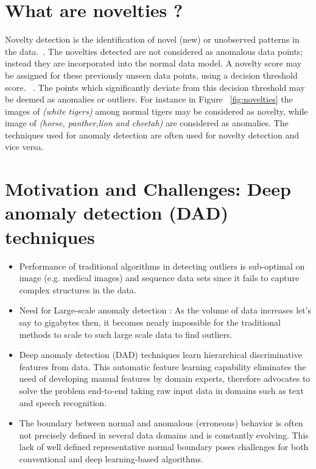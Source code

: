 \section{What are novelties ?}
Novelty detection is the identification of novel (new) or unobserved patterns in the data.~\cite{miljkovic2010review}. The novelties detected are not considered as anomalous data points; instead they are incorporated into the normal data model. A novelty score may be assigned for these previously unseen data points, using a decision threshold score. ~\cite{pimentel2014review}.  The points which significantly deviate from this decision threshold may be deemed as anomalies or outliers. For instance in Figure ~\ref{fig:novelties}  the images of \textit{(white tigers)} among normal tigers may be considered as novelty, while image of \textit{(horse, panther,lion and cheetah)} are considered as anomalies.
The techniques used for anomaly detection are often used for novelty detection and vice versa.



\section{Motivation and Challenges: Deep anomaly detection (DAD) techniques}
\begin{itemize}
\item Performance of traditional algorithms in detecting outliers is sub-optimal on  image (e.g. medical images) and sequence data sets since it fails to capture complex structures in the data.
\item  Need for Large-scale anomaly detection : As the volume of data increases let's say to gigabytes then, it becomes nearly impossible for the traditional methods to scale to such large scale data to find outliers.
\item  Deep anomaly detection (DAD) techniques learn hierarchical discriminative features from data. This automatic feature learning capability eliminates the need of developing manual features by domain experts, therefore advocates to solve the problem end-to-end taking raw input data in domains such as text and speech recognition.
\item The boundary between normal and anomalous (erroneous) behavior is often not precisely defined  in several data domains and is constantly evolving. This lack of well defined representative normal boundary poses challenges for both conventional and deep learning-based algorithms.
\end{itemize}

